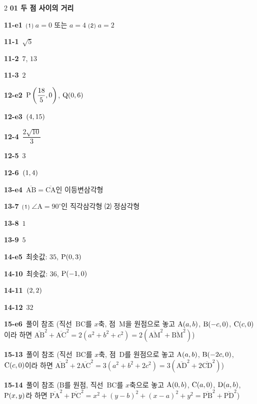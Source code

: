 \documentclass[10pt,a4paper]{article}
\newcommand{\pt}[1]{\mathrm{#1}}
\newcommand{\seg}[1]{\overline{\mathrm{#1}}}
\begin{document}
\begin{multicols}{2}\small
\noindent\textbf{01 두 점 사이의 거리}\par\smallskip
\noindent\textbf{11-e1}\ ⑴ $a=0$ 또는 $a=4$ ⑵ $a=2$\par
\noindent\textbf{11-1}\ $\sqrt{5}$\par
\noindent\textbf{11-2}\ $7$, $13$\par
\noindent\textbf{11-3}\ $2$\par
\noindent\textbf{12-e2}\ $\pt{P}\left(\dfrac{18}{5}{,}\mkern3mu\mathopen{}0\right)$, $\pt{Q}(0{,}\mkern3mu\mathopen{}6)$\par
\noindent\textbf{12-e3}\ $(4{,}\mkern3mu\mathopen{}15)$\par
\noindent\textbf{12-4}\ $\dfrac{2\sqrt{10}}{3}$\par
\noindent\textbf{12-5}\ $3$\par
\noindent\textbf{12-6}\ $(1{,}\mkern3mu\mathopen{}4)$\par
\noindent\textbf{13-e4}\ $\seg{AB}=\seg{CA}$인 이등변삼각형\par
\noindent\textbf{13-7}\ ⑴ $\angle\pt{A}=90^\circ$인 직각삼각형 ⑵ 정삼각형\par
\noindent\textbf{13-8}\ $1$\par
\noindent\textbf{13-9}\ $5$\par
\noindent\textbf{14-e5}\ 최솟값: $35$, $\pt{P}(0{,}\mkern3mu\mathopen{}3)$\par
\noindent\textbf{14-10}\ 최솟값: $36$, $\pt{P}(-1{,}\mkern3mu\mathopen{}0)$\par
\noindent\textbf{14-11}\ $(2{,}\mkern3mu\mathopen{}2)$\par
\noindent\textbf{14-12}\ $32$\par
\noindent\textbf{15-e6}\ 풀이 참조 (직선~$\pt{BC}$를 $x$축, 점~$\pt{M}$을 원점으로 놓고 $\pt{A}(a{,}\mkern3mu\mathopen{}b)$, $\pt{B}(-c{,}\mkern3mu\mathopen{}0)$, $\pt{C}(c{,}\mkern3mu\mathopen{}0)$이라 하면 $\seg{AB}^2+\seg{AC}^2=2(a^2+b^2+c^2)=2(\seg{AM}^2+\seg{BM}^2)$)\par
\noindent\textbf{15-13}\ 풀이 참조 (직선~$\pt{BC}$를 $x$축, 점~$\pt{D}$를 원점으로 놓고 $\pt{A}(a{,}\mkern3mu\mathopen{}b)$, $\pt{B}(-2c{,}\mkern3mu\mathopen{}0)$, $\pt{C}(c{,}\mkern3mu\mathopen{}0)$이라 하면 $\seg{AB}^2+2\seg{AC}^2=3(a^2+b^2+2c^2)=3(\seg{AD}^2+2\seg{CD}^2)$)\par
\noindent\textbf{15-14}\ 풀이 참조 ($\pt{B}$를 원점, 직선~$\pt{BC}$를 $x$축으로 놓고 $\pt{A}(0{,}\mkern3mu\mathopen{}b)$, $\pt{C}(a{,}\mkern3mu\mathopen{}0)$, $\pt{D}(a{,}\mkern3mu\mathopen{}b)$, $\pt{P}(x{,}\mkern3mu\mathopen{}y)$라 하면 $\seg{PA}^2+\seg{PC}^2=x^2+(y-b)^2+(x-a)^2+y^2=\seg{PB}^2+\seg{PD}^2$)\par

\end{multicols}
\end{document}
